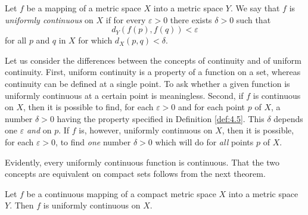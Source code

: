 \begin{mydef}
    \label{def:4.18}
    Let $f$ be a mapping of a metric space $X$ into a metric space $Y$.
    We say that $f$ is \emph{uniformly continuous} on $X$ 
    if for every $\varepsilon > 0$ there exists $\delta > 0$
    such that
    \begin{equation}
        \label{eq:4.15}
        d_Y(f(p),f(q)) < \varepsilon
    \end{equation}
    for all $p$ and $q$ in $X$ for which $d_X(p, q) < \delta$.
\end{mydef}
Let us consider the differences between the concepts of continuity and of
uniform continuity. 
First, uniform continuity is a property of a function on a set, 
whereas continuity can be defined at a single point. 
To ask whether a given function is uniformly continuous at a certain point is meaningless. 
Second, if $f$ is continuous on $X$, 
then it is possible to find, 
for each $\varepsilon > 0$ and for each point $p$ of $X$, 
a number $\delta > 0$ having the property specified in Definition \ref{def:4.5}. 
This $\delta$ depends one $\varepsilon$ \emph{and} on $p$. 
If $f$ is, however, uniformly continuous on $X$, 
then it is possible, for each $\varepsilon > 0$, 
to find \emph{one} number $\delta > 0$ which will do for \emph{all} points $p$ of $X$.

Evidently, every uniformly continuous function is continuous. 
That the two concepts are equivalent on compact sets follows from the next theorem. 

\begin{thm}
    \label{thm:4.19}
    Let $f$ be a continuous mapping of a compact metric space $X$ into a metric space $Y$. 
    Then $f$ is uniformly continuous on $X$.
\end{thm}

